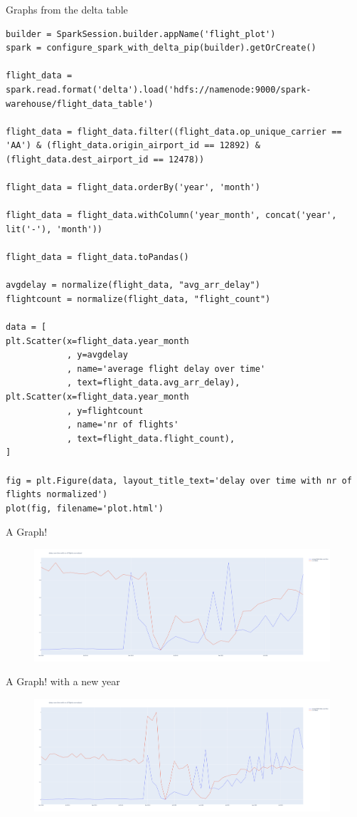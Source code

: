 \documentclass[10pt]{beamer}
\begin{document}
\begin{frame}[fragile]{Graphs from the delta table}

\begin{lstlisting}
builder = SparkSession.builder.appName('flight_plot')
spark = configure_spark_with_delta_pip(builder).getOrCreate()

flight_data = spark.read.format('delta').load('hdfs://namenode:9000/spark-warehouse/flight_data_table')

flight_data = flight_data.filter((flight_data.op_unique_carrier == 'AA') & (flight_data.origin_airport_id == 12892) & (flight_data.dest_airport_id == 12478))

flight_data = flight_data.orderBy('year', 'month')

flight_data = flight_data.withColumn('year_month', concat('year', lit('-'), 'month'))

flight_data = flight_data.toPandas()

avgdelay = normalize(flight_data, "avg_arr_delay")
flightcount = normalize(flight_data, "flight_count")

data = [
plt.Scatter(x=flight_data.year_month
            , y=avgdelay
            , name='average flight delay over time'
            , text=flight_data.avg_arr_delay),
plt.Scatter(x=flight_data.year_month
            , y=flightcount
            , name='nr of flights'
            , text=flight_data.flight_count),
]

fig = plt.Figure(data, layout_title_text='delay over time with nr of flights normalized')
plot(fig, filename='plot.html')
\end{lstlisting}
\end{frame}


\begin{frame}{A Graph!}
\begin{figure}
    \centering
    \includegraphics[width=11cm]{images/2019-2022.png}
    \label{fig:my_label}
\end{figure}
\end{frame}

\begin{frame}{A Graph! with a new year}
\begin{figure}
    \centering
    \includegraphics[width=11cm]{images/2018-2022.png}
    \label{fig:my_label}
\end{figure}
\end{frame}
\end{document}
